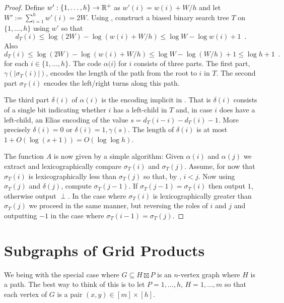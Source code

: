 \documentclass[kpfonts]{patmorin}
\begin{document}
\begin{proof}
  Define $w':\{1,\ldots,h\}\to \mathbb{R}^+$ as $w'(i)=w(i)+W/h$ and let $W':=\sum_{i=1}^h w'(i)=2W$.
  Using , construct a biased binary search tree $T$ on $\{1,\ldots,h\}$ using $w'$ so that 
  \[   
    d_T(i)\le\log (2W)-\log(w(i)+W/h) \le \log W-\log w(i)+1 \enspace .
  \]
  Also
  \[
  d_T(i)\le\log (2W)-\log(w(i)+W/h) \le \log W-\log (W/h)+1 \le \log h + 1\enspace .
  \]
  for each $i\in\{1,\ldots,h\}$.  The code $\alpha(i$) for $i$ consists of three parts.  The first part, $\gamma(|\sigma_T(i)|)$, encodes the length of the path from the root to $i$ in $T$. The second part $\sigma_T(i)$ encodes the left/right turns along this path.  
  
  The third part $\delta(i)$ of $\alpha(i)$ is the encoding implicit in .  That is $\delta(i)$ consists of
  a single bit indicating whether $i$ has a left-child in $T$ and, in case $i$ does have a left-child, an Elias encoding of the value $s=d_T(i-i)-d_T(i)-1$.  More precisely $\delta(i)=0$ or $\delta(i)=1,\gamma(s)$.  The length of $\delta(i)$ is at most $1+O(\log(s+1))=O(\log\log h)$.

  The function $A$ is now given by a simple algorithm: Given $\alpha(i)$ and $\alpha(j)$ we extract and lexicographically compare $\sigma_T(i)$ and $\sigma_T(j)$.  Assume, for now that $\sigma_T(i)$ is lexicographically less than $\sigma_T(j)$ so that, by , $i < j$.  Now using $\sigma_T(j)$ and $\delta(j)$, compute $\sigma_T(j-1)$.  If $\sigma_T(j-1)=\sigma_T(i)$ then output $1$, otherwise output $\perp$.
  In the case where $\sigma_T(i)$ is lexicographically greater than $\sigma_T(j)$ we proceed in the same manner, but reversing the roles of $i$ and $j$ and outputting $-1$ in the case where $\sigma_T(i-1)=\sigma_T(j)$.
\end{proof}

\section{Subgraphs of Grid Products}

We being with the special case where $G\subseteq H\boxtimes P$ is an $n$-vertex graph where $H$ is a path.  The best way to think of this is to let $P=1,\ldots,h$, $H=1,\ldots,m$ so that each vertex of $G$ is a pair $(x,y)\in[m]\times [h]$.  
\end{document}
